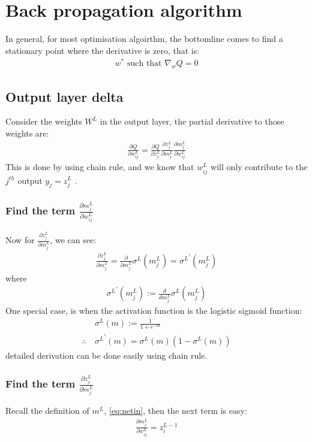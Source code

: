 \documentclass{article} [10pt] %
\begin{document}
\section{Back propagation algorithm}
In general, for most optimisation algoirthm, the bottomline comes to find a stationary point where the derivative is zero, that is:
\begin{align}
	w^* \text{ such that }\nabla_wQ = 0
\end{align}

\subsection{Output layer delta}
Consider the weights $W^L$ in the output layer, the partial derivative to those weights are:
\begin{align} \label{eq:output_delta}
\boxed{
	\frac{\partial Q}{\partial w^L_{ij}} = \frac{\partial Q}{\partial z^L_{j}}
							\frac{\partial z^L_{j}}{\partial m^L_{j}}
							\frac{\partial m^L_{j}}{\partial w^L_{ij}}
}
\end{align}
This is done by using chain rule, and we know that $w^L_{ij}$ will only contribute to the $j^{th}$ output $y_j=z^L_j$
.

\subsubsection{Find the term $\frac{\partial m^L_{j}}{\partial w^L_{ij}}$ }
Now for $\frac{\partial z^L_{j}}{\partial m^L_{j}}$, we can see:
\begin{align} \label{eq:dzdm_sigmoid_derivative}
\boxed{
	\frac{\partial z^L_{j}}{\partial m^L_{j}} = \frac{\partial}{\partial m^L_{j}}\sigma^L(m^L_{j}) = {\sigma^L}^\prime(m^L_{j})
}
\end{align}
where
\begin{align}
	{\sigma^L}^\prime(m^L_{j}) := \frac{d}{dm^L_{j}}\sigma^L(m^L_{j})
\end{align}
One special case, is when the activation function is the logistic sigmoid function:
\begin{align}
	&\sigma^L(m) := \frac{1}{1+e^{-m}} \\
	\therefore \ &{\sigma^L}^\prime(m) = \sigma^L(m)(1-\sigma^L(m))
\end{align}
detailed derivation can be done easily using chain rule.

\subsubsection{Find the term $\frac{\partial z^L_{j}}{\partial m^L_{j}}$}
Recall the definition of $m^L$, \eqref{eq:netin}, then the next term is easy:
\begin{align}\label{eq:dmdw_z}
\boxed{
	\frac{\partial m^L_{j}}{\partial w^L_{ij}} = z^{L-1}_i
}
\end{align}
\end{document}

